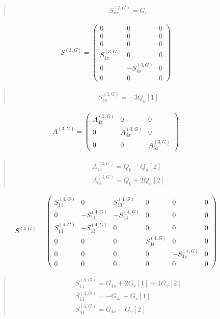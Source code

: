\documentclass[fleqn,10pt]{jsarticle}
\begin{document}
\begin{quote}
\begin{align*}
& S^{(2,G)}_{xx} = G_{v}
\end{align*}
\end{quote}
\begin{align*}
S^{(3,G)} = \begin{pmatrix} 0 & 0 & 0 \\ 0 & 0 & 0 \\ 0 & 0 & 0 \\ S^{(3,G)}_{4x} & 0 & 0 \\ 0 & - S^{(3,G)}_{4x} & 0 \\ 0 & 0 & 0 \end{pmatrix}
\end{align*}
\begin{quote}
\begin{align*}
& S^{(3,G)}_{4x} = - 3 Q_{u}[1]
\end{align*}
\end{quote}
\begin{align*}
A^{(3,G)} = \begin{pmatrix} A^{(3,G)}_{4x} & 0 & 0 \\ 0 & A^{(3,G)}_{4x} & 0 \\ 0 & 0 & A^{(3,G)}_{6z} \end{pmatrix}
\end{align*}
\begin{quote}
\begin{align*}
& A^{(3,G)}_{4x} = Q_{0} - Q_{u}[2] \\
& A^{(3,G)}_{6z} = Q_{0} + 2 Q_{u}[2]
\end{align*}
\end{quote}
\begin{align*}
S^{(4,G)} = \begin{pmatrix} S^{(4,G)}_{11} & 0 & S^{(4,G)}_{13} & 0 & 0 & 0 \\ 0 & - S^{(4,G)}_{11} & - S^{(4,G)}_{13} & 0 & 0 & 0 \\ S^{(4,G)}_{13} & - S^{(4,G)}_{13} & 0 & 0 & 0 & 0 \\ 0 & 0 & 0 & S^{(4,G)}_{44} & 0 & 0 \\ 0 & 0 & 0 & 0 & - S^{(4,G)}_{44} & 0 \\ 0 & 0 & 0 & 0 & 0 & 0 \end{pmatrix}
\end{align*}
\begin{quote}
\begin{align*}
& S^{(4,G)}_{11} = G_{4v} + 2 G_{v}[1] + 4 G_{v}[2] \\
& S^{(4,G)}_{13} = - G_{4v} + G_{v}[1] \\
& S^{(4,G)}_{44} = G_{4v} - G_{v}[2]
\end{align*}
\end{quote}
\end{document}
